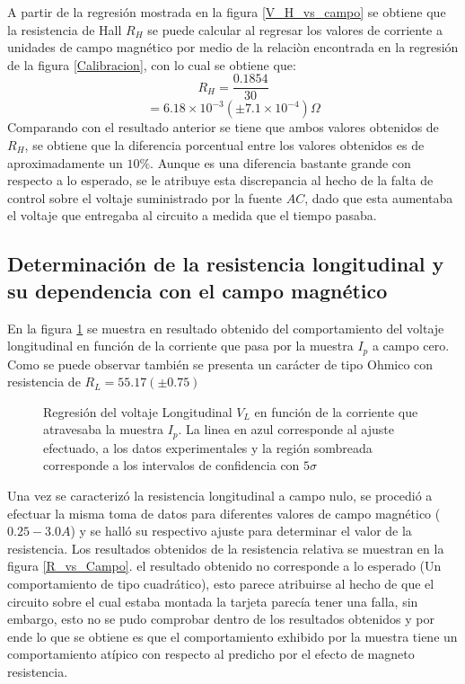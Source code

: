 \documentclass[%
 reprint,
 amsmath,amssymb,
 aps,
]{revtex4-1}
\begin{document}
A partir de la regresión mostrada en la figura \ref{V_H_vs_campo} se obtiene que la resistencia de Hall $R_H$ se puede calcular al regresar los valores de corriente a unidades de campo magnético por medio de la relaciòn encontrada en la regresión de la figura \ref{Calibracion}, con lo cual se obtiene que:
\[R_H=\frac{0.1854}{30}\]
\[=6.18\times 10^{-3} (\pm 7.1\times 10^{-4})\Omega\]
Comparando con el resultado anterior se tiene que ambos valores obtenidos de $R_H$, se obtiene que la diferencia porcentual entre los valores obtenidos es de aproximadamente un $10\%$. Aunque es una diferencia bastante grande con respecto a lo esperado, se le atribuye esta discrepancia al hecho de la falta de control sobre el voltaje suministrado por la fuente $AC$, dado que esta aumentaba el voltaje que entregaba al circuito a medida que el tiempo pasaba. 
\subsection{Determinación de la resistencia longitudinal y su dependencia con el campo magnético}
En la figura \ref{V longitudinal vs ip} se muestra en resultado obtenido del comportamiento del voltaje longitudinal en función de la corriente que pasa por la muestra $I_p$ a campo cero. Como se puede observar también se presenta un carácter de tipo Ohmico con resistencia de $R_L = 55.17 (\pm 0.75)$
\begin{figure}[h!]
\caption{\label{V longitudinal vs ip}Regresión del voltaje Longitudinal $V_L$ en función de la corriente que atravesaba la muestra $I_p$.  La linea en azul corresponde al ajuste efectuado, a los datos experimentales y la región sombreada corresponde a los intervalos de confidencia con $5\sigma$}
\end{figure}

Una vez se caracterizó la resistencia longitudinal a campo nulo, se procedió a efectuar la misma toma de datos para diferentes valores de campo magnético ($0.25 - 3.0 A$) y se halló su respectivo ajuste para determinar el valor de la resistencia. Los resultados obtenidos de la resistencia relativa se muestran en la figura \ref{R_vs_Campo}. el resultado obtenido no corresponde a lo esperado (Un comportamiento de tipo cuadrático), esto parece atribuirse al hecho de que el circuito sobre el cual estaba montada la tarjeta parecía tener una falla, sin embargo, esto no se pudo comprobar dentro de los resultados obtenidos y por ende lo que se obtiene es que el comportamiento exhibido por la muestra tiene un comportamiento atípico con respecto al predicho por el efecto de magneto resistencia.
\end{document}
